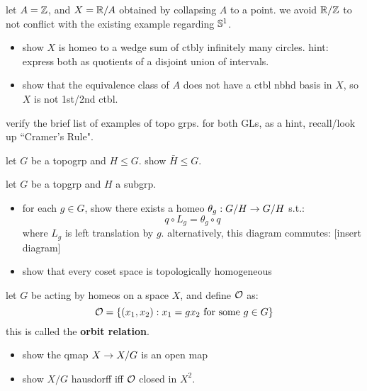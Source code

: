 \begin{exr}[source=Primary Source Material]
    let $A=\mathbb{Z}$, and $X=\mathbb{R}/A$ obtained by collapsing $A$ to a point. we avoid
    $\mathbb{R}/\mathbb{Z}$ to not conflict with the existing example regarding $\mathbb{S}^{1}$.
    \begin{itemize}
        \item show $X$ is homeo to a wedge sum of ctbly infinitely many circles.
            hint: express both as quotients of a disjoint union of intervals.
        \item show that the equivalence class of $A$ does not have a ctbl nbhd
            basis in $X$, so $X$ is not 1st/2nd ctbl.
    \end{itemize}
\end{exr}

\begin{exr}[source=Primary Source Material]
    verify the brief list of examples of topo grps. for both GLs, as a hint,
    recall/look up ``Cramer's Rule".
\end{exr}

\begin{exr}[source=Primary Source Material]
    let $G$ be a topogrp and $H \leq G$. show $\bar{H}\leq G$.
\end{exr}

\begin{exr}[source=Primary Source Material]
    let $G$ be a topgrp and $H$ a subgrp.
    \begin{itemize}
        \item for each $g\in G$, show there exists a homeo $\theta_{g}:G/H\rightarrow
            G/H$ s.t.:
            \begin{equation*}
                q\circ L_{g} = \theta_{g}\circ q
            \end{equation*}
            where $L_{g}$ is left translation by $g$. alternatively, this diagram
            commutes: [insert diagram]
        \item show that every coset space is topologically homogeneous
    \end{itemize}
\end{exr}

\newpage
\begin{exr}[source=Primary Source Material]
    let $G$ be acting by homeos on a space $X$, and define $\mathcal{O}$ as:
    \begin{equation*}
        \mathcal{O} = \left\{{(x_{1},x_{2}):x_{1}=gx_{2} \textrm{ for some } g\in G}\right\}
    \end{equation*}
    this is called the \textbf{orbit relation}.
    \begin{itemize}
        \item show the qmap $X\rightarrow X/G$ is an open map
        \item show $X/G$ hausdorff iff $\mathcal{O}$ closed in $X^{2}$.
    \end{itemize}
\end{exr}

